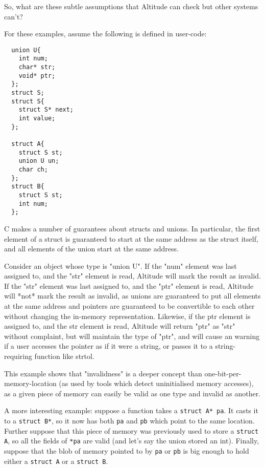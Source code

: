 \documentclass[10pt,a4paper]{report}
\begin{document}
So, what are these subtle assumptions that Altitude can check but other systems can't?

For these examples, assume the following is defined in user-code:

\begin{verbatim}
  union U{
    int num;
    char* str;
    void* ptr;
  };
  struct S;
  struct S{
    struct S* next;
    int value;
  };

  struct A{
    struct S st;
    union U un;
    char ch;
  };
  struct B{
    struct S st;
    int num;
  };

\end{verbatim}

C makes a number of guarantees about structs and unions. In particular, the first element of a struct is guaranteed to start at the same address as the struct itself, and all elements of the union start at the same address.

Consider an object whose type is "union U". If the "num" element was last assigned to, and the "str" element is read, Altitude will mark the result as invalid. If the "str" element was last assigned to, and the "ptr" element is read, Altitude will *not* mark the result as invalid, as unions are guaranteed to put all elements at the same address and pointers are guaranteed to be convertible to each other without changing the in-memory representation. Likewise, if the ptr element is assigned to, and the str element is read, Altitude will return "ptr" as "str" without complaint, but will maintain the type of "ptr", and will cause an warning if a user accesses the pointer as if it were a string, or passes it to a string-requiring function like strtol.

This example shows that "invalidness" is a deeper concept than one-bit-per-memory-location (as used by tools which detect uninitialised memory accesses), as a given piece of memory can easily be valid as one type and invalid as another.

A more interesting example: suppose a function takes a \lstinline{struct A* pa}. It casts it to a \lstinline{struct B*}, so it now has both \lstinline{pa} and \lstinline{pb} which point to the same location. Further suppose that this piece of memory was previously used to store a \lstinline{struct A}, so all the fields of \lstinline{*pa} are valid (and let's say the union stored an int). Finally, suppose that the blob of memory pointed to by \lstinline{pa} or \lstinline{pb} is big enough to hold either a \lstinline{struct A} or a \lstinline{struct B}.
\end{document}
